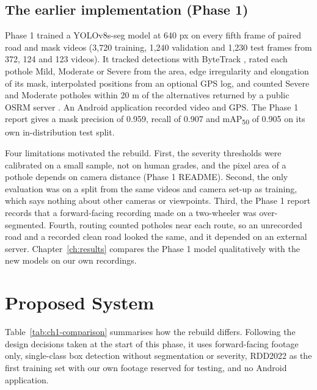 \subsection{The earlier implementation (Phase 1)}
Phase 1 trained a YOLOv8s-seg model \cite{jocher2023yolov8} at 640 px on every fifth frame of paired road and mask videos (3,720 training, 1,240 validation and 1,230 test frames from 372, 124 and 123 videos). It tracked detections with ByteTrack \cite{zhang2022bytetrack}, rated each pothole Mild, Moderate or Severe from the area, edge irregularity and elongation of its mask, interpolated positions from an optional GPS log, and counted Severe and Moderate potholes within 20 m of the alternatives returned by a public OSRM server \cite{luxen2011osrm}. An Android application recorded video and GPS. The Phase 1 report gives a mask precision of 0.959, recall of 0.907 and mAP\textsubscript{50} of 0.905 on its own in-distribution test split.

Four limitations motivated the rebuild. First, the severity thresholds were calibrated on a small sample, not on human grades, and the pixel area of a pothole depends on camera distance (Phase 1 README). Second, the only evaluation was on a split from the same videos and camera set-up as training, which says nothing about other cameras or viewpoints. Third, the Phase 1 report records that a forward-facing recording made on a two-wheeler was over-segmented. Fourth, routing counted potholes near each route, so an unrecorded road and a recorded clean road looked the same, and it depended on an external server. Chapter~\ref{ch:results} compares the Phase 1 model qualitatively with the new models on our own recordings.

\section{Proposed System}
Table~\ref{tab:ch1-comparison} summarises how the rebuild differs. Following the design decisions taken at the start of this phase, it uses forward-facing footage only, single-class box detection without segmentation or severity, RDD2022 as the first training set with our own footage reserved for testing, and no Android application.

